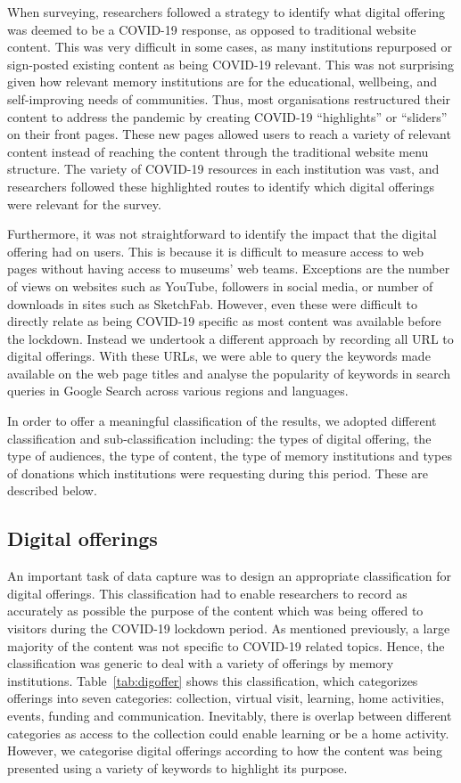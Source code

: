 \documentclass{egpubl}
\begin{document}
When surveying, researchers followed a strategy to identify what digital offering was deemed to be a COVID-19 response, as opposed to traditional website content. This was very difficult in some cases, as many institutions repurposed or sign-posted existing content as being COVID-19 relevant. This was not surprising given how relevant memory institutions are for the educational, wellbeing, and self-improving needs of communities. Thus, most organisations restructured their content to address the pandemic by creating COVID-19 “highlights” or “sliders” on their front pages. These new pages allowed users to reach a variety of relevant content instead of reaching the content through the traditional website menu structure. The variety of COVID-19 resources in each institution was vast, and researchers followed these highlighted routes to identify which digital offerings were relevant for the survey.

Furthermore, it was not straightforward to identify the impact that the digital offering had on users. This is because it is difficult to measure access to web pages without having access to museums’ web teams. Exceptions are the number of views on websites such as YouTube, followers in social media, or number of downloads in sites such as SketchFab. However, even these were difficult to directly relate as being COVID-19 specific as most content was available before the lockdown. Instead we undertook a different approach by recording all URL to digital offerings. With these URLs, we were able to query the keywords made available on the web page titles and analyse the popularity of keywords in search queries in Google Search across various regions and languages. 

In order to offer a meaningful classification of the results, we adopted different classification and sub-classification including: the types of digital offering, the type of audiences, the type of content, the type of memory institutions and types of donations which institutions were requesting during this period. These are described below.

\subsection{Digital offerings}
An important task of data capture was to design an appropriate classification for digital offerings. This classification had to enable researchers to record as accurately as possible the purpose of the content which was being offered to visitors during the COVID-19 lockdown period. As mentioned previously, a large majority of the content was not specific to COVID-19 related topics. Hence, the classification was generic to deal with a variety of offerings by memory institutions. Table~\ref{tab:digoffer} shows this classification, which categorizes offerings into seven categories: collection, virtual visit, learning, home activities, events, funding and communication. Inevitably, there is overlap between different categories as access to the collection could enable learning or be a home activity. However, we categorise digital offerings according to how the content was being presented using a variety of keywords to highlight its purpose. 
\end{document}
